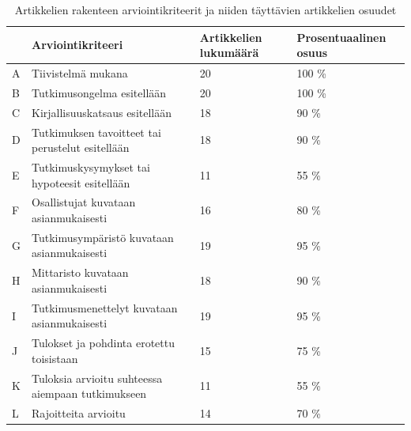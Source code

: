 \documentclass[utf8]{gradu3}
\begin{document}
\begin{table}[h]
    \scriptsize
    \begin{tabular}{llll}
        \toprule
        & \textbf{Arviointikriteeri} & \textbf{Artikkelien lukumäärä} & \textbf{Prosentuaalinen osuus} \\
        \toprule
        A & Tiivistelmä mukana & 20 & 100 \% \\
        B & Tutkimusongelma esitellään & 20 & 100 \% \\
        C & Kirjallisuuskatsaus esitellään & 18 & 90 \% \\
        D & Tutkimuksen tavoitteet tai perustelut esitellään & 18 & 90 \% \\
        E & Tutkimuskysymykset tai hypoteesit esitellään & 11 & 55 \% \\
        F & Osallistujat kuvataan asianmukaisesti & 16 & 80 \% \\
        G & Tutkimusympäristö kuvataan asianmukaisesti & 19 & 95 \% \\
        H & Mittaristo kuvataan asianmukaisesti & 18 & 90 \% \\
        I & Tutkimusmenettelyt kuvataan asianmukaisesti & 19 & 95 \% \\
        J & Tulokset ja pohdinta erotettu toisistaan & 15 & 75 \% \\
        K & Tuloksia arvioitu suhteessa aiempaan tutkimukseen & 11 & 55 \% \\
        L & Rajoitteita arvioitu & 14 & 70 \% \\
        \bottomrule
    \end{tabular}
    \caption{Artikkelien rakenteen arviointikriteerit ja niiden täyttävien artikkelien osuudet}
    \label{tbl:rakenteen-kriteerit}
\end{table}
\end{document}
